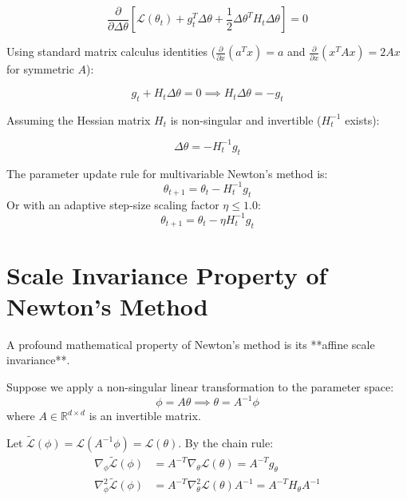 \begin{equation}
\frac{\partial}{\partial \Delta \theta} \left[ \mathcal{L}(\theta_t) + g_t^T \Delta \theta + \frac{1}{2} \Delta \theta^T H_t \Delta \theta \right] = 0
\end{equation}

Using standard matrix calculus identities ($\frac{\partial}{\partial x}(a^T x) = a$ and $\frac{\partial}{\partial x}(x^T A x) = 2 A x$ for symmetric $A$):

\begin{equation}
g_t + H_t \Delta \theta = 0 \implies H_t \Delta \theta = -g_t
\end{equation}

Assuming the Hessian matrix $H_t$ is non-singular and invertible ($H_t^{-1}$ exists):

\begin{equation}
\Delta \theta = -H_t^{-1} g_t
\end{equation}

\begin{mathbox}
The parameter update rule for multivariable Newton's method is:
\begin{equation}
\theta_{t+1} = \theta_t - H_t^{-1} g_t
\end{equation}
Or with an adaptive step-size scaling factor $\eta \le 1.0$:
\begin{equation}
\theta_{t+1} = \theta_t - \eta H_t^{-1} g_t
\end{equation}
\end{mathbox}


\section{Scale Invariance Property of Newton's Method}
A profound mathematical property of Newton's method is its **affine scale invariance**.

Suppose we apply a non-singular linear transformation to the parameter space:
\begin{equation}
\phi = A \theta \implies \theta = A^{-1} \phi
\end{equation}
where $A \in \mathbb{R}^{d \times d}$ is an invertible matrix.

Let $\tilde{\mathcal{L}}(\phi) = \mathcal{L}(A^{-1} \phi) = \mathcal{L}(\theta)$. By the chain rule:
\begin{align}
\nabla_\phi \tilde{\mathcal{L}}(\phi) &= A^{-T} \nabla_\theta \mathcal{L}(\theta) = A^{-T} g_\theta \\
\nabla_\phi^2 \tilde{\mathcal{L}}(\phi) &= A^{-T} \nabla_\theta^2 \mathcal{L}(\theta) A^{-1} = A^{-T} H_\theta A^{-1}
\end{align}

